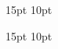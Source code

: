 
\usepackage{amsmath, amsfonts, amssymb}




\usepackage{amsthm}

 
    {15pt}                  %
    {10pt}                  %
    {\itshape}              %
    {}                      %
    {\bf}                   %
    {}                      %
    {\newline}              %
    {}                      %

    {15pt}
    {10pt}
    {}
    {}
    {\bf}
    {}
    {\newline}
    {}


